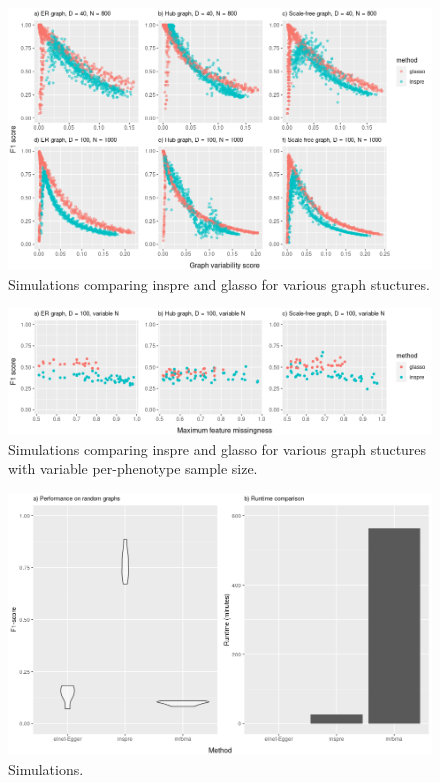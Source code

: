 \documentclass{article}
\begin{document}
\newpage
\begin{figure}[H]\label{figureS1}
\includegraphics[width=\textwidth]{figures/figure_S1.png}
\caption{Simulations comparing inspre and glasso for various graph stuctures.}
\end{figure}

\newpage
\begin{figure}[H]\label{figureS2}
\includegraphics[width=\textwidth]{figures/figure_S2.png}
\caption{Simulations comparing inspre and glasso for various graph stuctures
with variable per-phenotype sample size.}
\end{figure}

\newpage
\begin{figure}[H]\label{figureS4}
\includegraphics[width=\textwidth]{figures/figure_S4.png}
\caption{Simulations.}
\end{figure}
\end{document}
